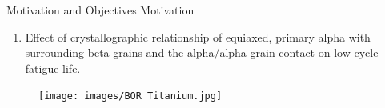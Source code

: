 \documentclass[10pt]{beamer}
\begin{document}
{%
\begin{frame}[fragile]{Motivation and Objectives}
Motivation
\begin{enumerate}

\item Effect of crystallographic relationship of equiaxed, primary alpha with surrounding beta grains and the alpha/alpha grain contact on low cycle fatigue life.
\end{enumerate}

\begin{figure}[H]
    \centering
        \texttt{[image: images/BOR Titanium.jpg]}
\end{figure}


\end{frame}
}

\end{document}
